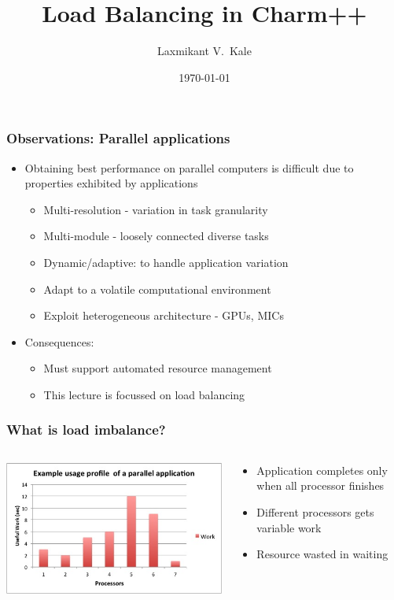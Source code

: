 \documentclass{beamer}
\title{Load Balancing in Charm++}
\author[Laxmikant V.~Kale]{
Laxmikant V.~Kale
}
\date{\today}
\begin{document}
\begin{frame}[fragile]
  \frametitle{Observations: Parallel applications}
    \begin{itemize}
    \item Obtaining best performance on parallel computers is difficult due to properties exhibited by applications 
      \begin{itemize}
        \item Multi-resolution - variation in task granularity
        \item Multi-module - loosely connected diverse tasks
        \item {\color{red} Dynamic/adaptive: to handle application variation}
        \item {\color{red} Adapt to a volatile computational environment}
        \item Exploit heterogeneous architecture - GPUs, MICs
      \end{itemize}
    \item Consequences:
      \begin{itemize}
        \item Must support automated resource management
        \item This lecture is focussed on {\color{red} load balancing}
      \end{itemize}
    \end{itemize}
\end{frame}

\begin{frame}[fragile]
  \frametitle{What is load imbalance?}
  \begin{columns}
  \begin{column}{.6\textwidth} 
  \centering
  \includegraphics[width=\textwidth]{cs598lvk/diagrams/load_imbalance.jpg}
  \end{column}
  \begin{column}{.4\textwidth} 
  \begin{itemize}
  \item Application completes only when all processor finishes 
  \item Different processors gets variable work
  \item Resource wasted in waiting
  \end{itemize}
  \end{column}
  \end{columns}
\end{frame}
\end{document}
